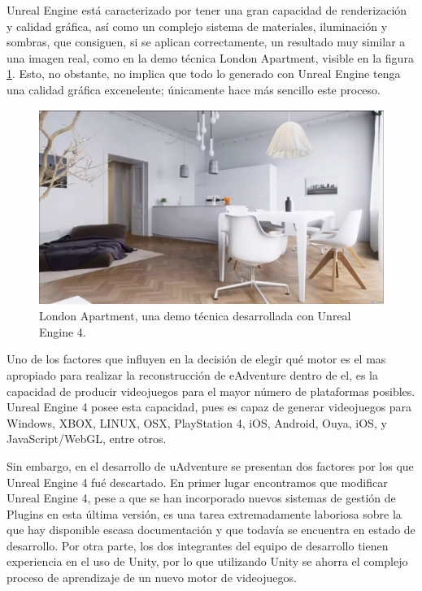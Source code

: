 Unreal Engine está caracterizado por tener una gran capacidad de renderización y calidad gráfica, así como un complejo sistema de materiales, iluminación y sombras, que consiguen, si se aplican correctamente, un resultado muy similar a una imagen real, como en la demo técnica London Apartment, visible en la figura \ref{londonapartment}. Esto, no obstante, no implica que todo lo generado con Unreal Engine tenga una calidad gráfica excenelente; únicamente hace más sencillo este proceso.

\begin{figure}[htb]
	\centerline{\includegraphics[height=2.5in]{figures/london-apartment.jpg}}
	\caption[Unreal Engine 4 - London Apartment]{London Apartment, una demo técnica desarrollada con Unreal Engine 4.}
	\label{londonapartment}
\end{figure}

Uno de los factores que influyen en la decisión de elegir qué motor es el mas apropiado para realizar la reconstrucción de eAdventure dentro de el, es la capacidad de producir videojuegos para el mayor número de plataformas posibles. Unreal Engine 4 posee esta capacidad, pues es capaz de generar videojuegos para Windows, XBOX, LINUX, OSX, PlayStation 4, iOS, Android, Ouya, iOS, y JavaScript/WebGL, entre otros.

Sin embargo, en el desarrollo de uAdventure se presentan dos factores por los que Unreal Engine 4 fué descartado. En primer lugar encontramos que modificar Unreal Engine 4, pese a que se han incorporado nuevos sistemas de gestión de Plugins en esta última versión, es una tarea extremadamente laboriosa sobre la que hay disponible escasa documentación y que todavía se encuentra en estado de desarrollo. Por otra parte, los dos integrantes del equipo de desarrollo tienen experiencia en el uso de Unity, por lo que utilizando Unity se ahorra el complejo proceso de aprendizaje de un nuevo motor de videojuegos.

